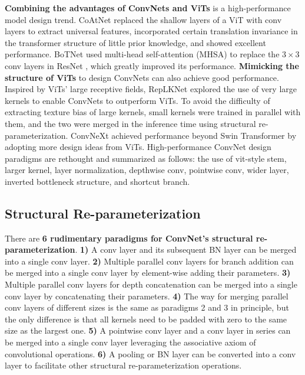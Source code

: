 \documentclass[preprint,12pt]{elsarticle}
\begin{document}
\textbf{Combining the advantages of ConvNets and ViTs} is a high-performance model design trend. CoAtNet \cite{coatnet} replaced the shallow layers of a ViT with conv layers to extract universal features, incorporated certain translation invariance in the transformer structure of little prior knowledge, and showed excellent performance. BoTNet \cite{botnet} used multi-head self-attention (MHSA) to replace the $3 \times 3$ conv layers in ResNet \cite{resnet}, which greatly improved its performance. \textbf{Mimicking the structure of ViTs} to design ConvNets can also achieve good performance. Inspired by ViTs' large receptive fields, RepLKNet \cite{replknet} explored the use of very large kernels to enable ConvNets to outperform ViTs. To avoid the difficulty of extracting texture bias of large kernels, small kernels were trained in parallel with them, and the two were merged in the inference time using structural re-parameterization. ConvNeXt \cite{convnext} achieved performance beyond Swin Transformer by adopting more design ideas from ViTs. High-performance ConvNet design paradigms are rethought and summarized as follows: the use of vit-style stem, larger kernel, layer normalization, depthwise conv, pointwise conv, wider layer, inverted bottleneck structure, and shortcut branch.

\subsection{Structural Re-parameterization}
\label{subsec:2-2}

There are \textbf{6 rudimentary paradigms for ConvNet's structural re-parameterization}. \textbf{1)} A conv layer and its subsequent BN layer can be merged into a single conv layer. \textbf{2)} Multiple parallel conv layers for branch addition can be merged into a single conv layer by element-wise adding their parameters. \textbf{3)} Multiple parallel conv layers for depth concatenation can be merged into a single conv layer by concatenating their parameters. \textbf{4)} The way for merging parallel conv layers of different sizes is the same as paradigms 2 and 3 in principle, but the only difference is that all kernels need to be padded with zero to the same size as the largest one. \textbf{5)} A pointwise conv layer and a conv layer in series can be merged into a single conv layer leveraging the associative axiom of convolutional operations.  \textbf{6)} A pooling or BN layer can be converted into a conv layer to facilitate other structural re-parameterization operations.
\end{document}
